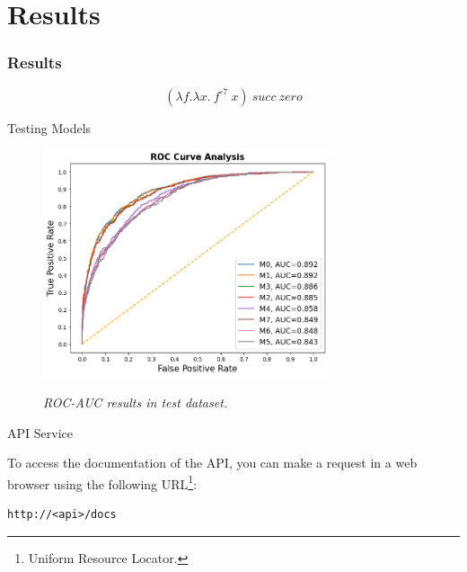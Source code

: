 \documentclass[dvipsnames,mathserif]{beamer}
\begin{document}
{    \section{Results}

    \begin{frame}
      \frametitle{Results}


      \[(\lambda f. \lambda x.\ f^{\circ 7}\ x)\ succ\ zero\]
    \end{frame}


    \begin{frame}
      \large Testing Models
      \vspace{0.25cm}
      \begin{figure}[H]
        \centering
        \includegraphics[width=0.75\textwidth]{images/rocaucanalysis-all.png}
        \caption[ROC-AUC results in test dataset]{\textit{ROC-AUC results in test dataset. }}
        {\label{fig:rocaucanalysis-all}}
      \end{figure}

    \end{frame}

    \begin{frame}[fragile]

      \large API Service
      \vspace{0.25cm}

      \footnotesize
      To access the documentation of the API, you can make a request in a web
      browser using the following URL\footnote{Uniform Resource Locator.}:

      \vspace{0.1cm}

      \begin{Verbatim}[fontsize=\tiny]
http://<api>/docs
      \end{Verbatim}


\end{frame}}
\end{document}
